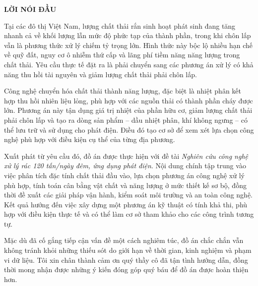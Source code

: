 \documentclass[../main.tex]{subfiles}
\begin{document}
\begin{center}
    \Large{\textbf{LỜI NÓI ĐẦU}}\\
\end{center}
\vspace{1cm}

Tại các đô thị Việt Nam, lượng chất thải rắn sinh hoạt phát sinh đang tăng nhanh cả về khối lượng lẫn mức độ phức tạp của thành phần, trong khi chôn lấp vẫn là phương thức xử lý chiếm tỷ trọng lớn. Hình thức này bộc lộ nhiều hạn chế về quỹ đất, nguy cơ ô nhiễm thứ cấp và lãng phí tiềm năng năng lượng trong chất thải. Yêu cầu thực tế đặt ra là phải chuyển sang các phương án xử lý có khả năng thu hồi tài nguyên và giảm lượng chất thải phải chôn lấp.

Công nghệ chuyển hóa chất thải thành năng lượng, đặc biệt là nhiệt phân kết hợp thu hồi nhiên liệu lỏng, phù hợp với các nguồn thải có thành phần cháy được lớn. Phương án này tận dụng giá trị nhiệt của phần hữu cơ, giảm lượng chất thải phải chôn lấp và tạo ra dòng sản phẩm -- dầu nhiệt phân, khí không ngưng -- có thể lưu trữ và sử dụng cho phát điện. Điều đó tạo cơ sở để xem xét lựa chọn công nghệ phù hợp với điều kiện cụ thể của từng địa phương.

Xuất phát từ yêu cầu đó, đồ án được thực hiện với đề tài \textit{Nghiên cứu công nghệ xử lý rác 120 tấn/ngày đêm, ứng dụng phát điện}. Nội dung chính tập trung vào việc phân tích đặc tính chất thải đầu vào, lựa chọn phương án công nghệ xử lý phù hợp, tính toán cân bằng vật chất và năng lượng ở mức thiết kế sơ bộ, đồng thời đề xuất các giải pháp vận hành, kiểm soát môi trường và an toàn công nghệ. Kết quả hướng đến việc xây dựng một phương án kỹ thuật có tính khả thi, phù hợp với điều kiện thực tế và có thể làm cơ sở tham khảo cho các công trình tương tự.

Mặc dù đã cố gắng tiếp cận vấn đề một cách nghiêm túc, đồ án chắc chắn vẫn không tránh khỏi những thiếu sót do giới hạn về thời gian, kinh nghiệm và phạm vi dữ liệu. Tôi xin chân thành cảm ơn quý thầy cô đã tận tình hướng dẫn, đồng thời mong nhận được những ý kiến đóng góp quý báu để đồ án được hoàn thiện hơn.
\end{document}
